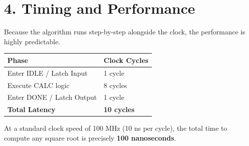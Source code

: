 \documentclass[12pt,a4paper]{article}
\begin{document}
\section*{4. Timing and Performance}
Because the algorithm runs step-by-step alongside the clock, the performance is highly predictable. 

\begin{center}
\begin{tabular}{@{}ll@{}}
\toprule
\textbf{Phase} & \textbf{Clock Cycles} \\
\midrule
Enter IDLE / Latch Input  & 1 cycle \\
Execute CALC logic & 8 cycles \\
Enter DONE / Latch Output & 1 cycle \\
\midrule
\textbf{Total Latency} & \textbf{10 cycles} \\
\bottomrule
\end{tabular}
\end{center}

At a standard clock speed of 100 MHz (10 ns per cycle), the total time to compute any square root is precisely \textbf{100 nanoseconds}.
\end{document}
